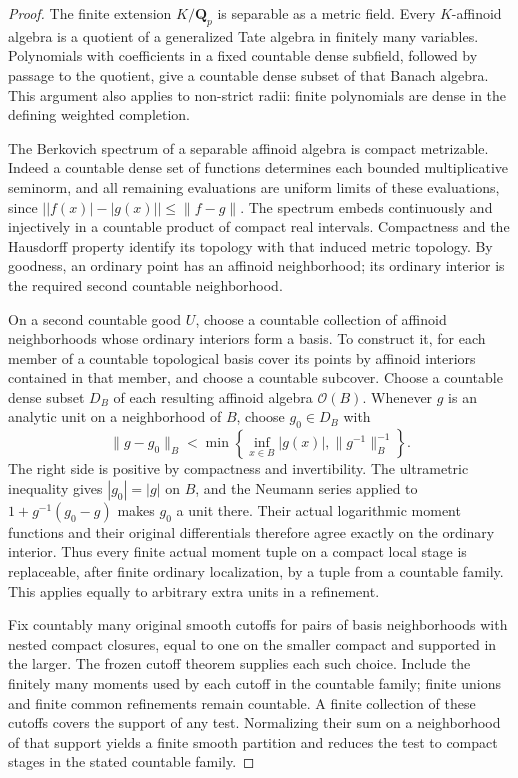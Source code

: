 \begin{proof}
The finite extension $K/\mathbf Q_p$ is separable as a metric field.
Every $K$-affinoid algebra is a quotient of a generalized Tate
algebra in finitely many variables. Polynomials with coefficients
in a fixed countable dense subfield, followed by passage to the
quotient, give a countable dense subset of that Banach algebra.
This argument also applies to non-strict radii: finite polynomials
are dense in the defining weighted completion.

The Berkovich spectrum of a separable affinoid algebra is compact
metrizable. Indeed a countable dense set of functions determines
each bounded multiplicative seminorm, and all remaining evaluations
are uniform limits of these evaluations, since
$\bigl||f(x)|-|g(x)|\bigr|\le\|f-g\|$. The spectrum embeds
continuously and injectively in a countable product of compact
real intervals. Compactness and the Hausdorff property identify
its topology with that induced metric topology. By goodness, an
ordinary point has an affinoid neighborhood; its ordinary interior
is the required second countable neighborhood.

On a second countable good $U$, choose a countable collection of
affinoid neighborhoods whose ordinary interiors form a basis.
To construct it, for each member of a countable topological basis
cover its points by affinoid interiors contained in that member,
and choose a countable subcover. Choose a countable dense subset
$D_B$ of each resulting affinoid algebra $\mathcal O(B)$.
Whenever $g$ is an analytic unit on a neighborhood of $B$, choose
$g_0\in D_B$ with
\[
 \|g-g_0\|_B<\min\left\{\inf_{x\in B}|g(x)|,\|g^{-1}\|_B^{-1}\right\}.
 \tag{DI1}
\]
The right side is positive by compactness and invertibility. The
ultrametric inequality gives $|g_0|=|g|$ on $B$, and the Neumann
series applied to $1+g^{-1}(g_0-g)$ makes $g_0$ a unit there. Their actual
logarithmic moment functions and their original differentials
therefore agree exactly on the ordinary interior. Thus every finite
actual moment tuple on a compact local stage is replaceable, after
finite ordinary localization, by a tuple from a countable family.
This applies equally to arbitrary extra units in a refinement.

Fix countably many original smooth cutoffs for pairs of basis
neighborhoods with nested compact closures, equal to one on the
smaller compact and supported in the larger. The frozen cutoff
theorem supplies each such choice. Include the finitely many
moments used by each cutoff in the countable family; finite unions
and finite common refinements remain countable. A finite collection
of these cutoffs covers the support of any test. Normalizing their
sum on a neighborhood of that support yields a finite smooth
partition and reduces the test to compact stages in the stated
countable family.


\end{proof}

